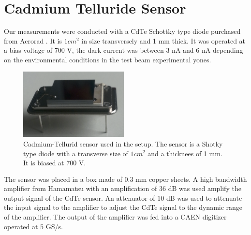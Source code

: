 %
%
%
\section{Cadmium Telluride Sensor}
\label{sec:siliconpad}

Our measurements were conducted with a CdTe Schottky type diode purchased from Acrorad \cite{acrorad}. It is $1 cm^2$ in size transversely and 1 mm thick.
It was operated at a bias voltage of 700 V, the dark current was between 3 nA and 6 nA depending on the environmental conditions in the test beam experimental yones.     

\begin{figure}[htbp] 
\centering
\includegraphics[width=0.49\textwidth]{figures/CdTeSensor.png} 
\caption{Cadmium-Tellurid sensor used in the setup. The sensor is a Shotky type diode with a transverse size of $1 cm^2$ and a thicknees of 1 mm. It is biased at 700 V.} 
\label{fig:CdTeSensor} 
\end{figure} 


The sensor was placed in a box made of 0.3 mm copper sheets. 
A high bandwidth amplifier from Hamamatsu with an amplification of 36 dB was used amplify the output signal of the CdTe sensor.
An attenuator of 10 dB was used to attenuate the input signal to the amplifier to adjust the CdTe signal to the dynamic range of the amplifier.
The output of the amplifier was fed into a CAEN digitizer operated at 5 GS/s.
